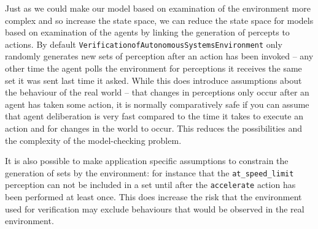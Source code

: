 Just as we could make our model based on examination of the
environment more complex and so increase the state space, we can
reduce the state space for models based on examination of the agents
by linking the generation of percepts to actions.  By default \texttt{VerificationofAutonomousSystemsEnvironment}
 only randomly generates new sets of perception
after an action has been invoked -- any other time the agent polls the environment for perceptions it receives the same set it was sent last time it asked.  While this
does introduce assumptions about the behaviour of the real world --
that changes in perceptions only occur after an agent has taken some
action, it is normally comparatively safe if you can assume that agent
deliberation is very fast compared to the time it takes to execute an
action and for changes in the world to occur.  This reduces the possibilities and the complexity of the
model-checking problem.  

It is also possible to make application specific assumptions to constrain the generation of sets by the environment:  for instance that the \lstinline{at_speed_limit} perception can not be included in a set until after the \lstinline{accelerate} action has been performed at least once.  This does increase the risk that the environment used for verification may exclude behaviours that would be observed in the real environment.

